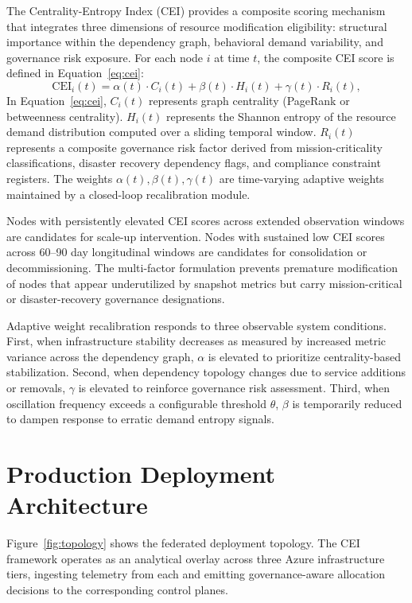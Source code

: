 \documentclass[runningheads]{llncs}
\begin{document}
The Centrality-Entropy Index (CEI) provides a composite scoring mechanism that integrates three dimensions of resource modification eligibility: structural importance within the dependency graph, behavioral demand variability, and governance risk exposure. For each node $i$ at time $t$, the composite CEI score is defined in Equation~\ref{eq:cei}:
\begin{equation}
\text{CEI}_i(t) = \alpha(t) \cdot C_i(t) + \beta(t) \cdot H_i(t) + \gamma(t) \cdot R_i(t),
\label{eq:cei}
\end{equation}
In Equation~\ref{eq:cei}, $C_i(t)$ represents graph centrality (PageRank or betweenness centrality). $H_i(t)$ represents the Shannon entropy of the resource demand distribution computed over a sliding temporal window. $R_i(t)$ represents a composite governance risk factor derived from mission-criticality classifications, disaster recovery dependency flags, and compliance constraint registers. The weights $\alpha(t), \beta(t), \gamma(t)$ are time-varying adaptive weights maintained by a closed-loop recalibration module.

Nodes with persistently elevated CEI scores across extended observation windows are candidates for scale-up intervention. Nodes with sustained low CEI scores across 60--90 day longitudinal windows are candidates for consolidation or decommissioning. The multi-factor formulation prevents premature modification of nodes that appear underutilized by snapshot metrics but carry mission-critical or disaster-recovery governance designations.

Adaptive weight recalibration responds to three observable system conditions. First, when infrastructure stability decreases as measured by increased metric variance across the dependency graph, $\alpha$ is elevated to prioritize centrality-based stabilization. Second, when dependency topology changes due to service additions or removals, $\gamma$ is elevated to reinforce governance risk assessment. Third, when oscillation frequency exceeds a configurable threshold $\theta$, $\beta$ is temporarily reduced to dampen response to erratic demand entropy signals.

\section{Production Deployment Architecture}
\label{sec:architecture}

Figure~\ref{fig:topology} shows the federated deployment topology. The CEI framework operates as an analytical overlay across three Azure infrastructure tiers, ingesting telemetry from each and emitting governance-aware allocation decisions to the corresponding control planes.
\end{document}

